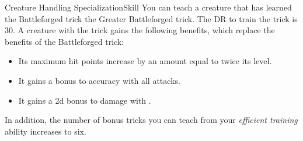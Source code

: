 \begin{feat}{Creature Handling Specialization}{Skill}
         You can teach a creature that has learned the Battleforged trick the Greater Battleforged trick.
        The DR to train the trick is 30.
        A creature with the trick gains the following benefits, which replace the benefits of the Battleforged trick:
        \begin{itemize}
            \item Its maximum hit points increase by an amount equal to twice its level.
            \item It gains a  bonus to accuracy with all attacks.
            \item It gains a \plus2d bonus to damage with .
        \end{itemize}
        In addition, the number of bonus tricks you can teach from your \textit{efficient training} ability increases to six.
    \end{feat}

